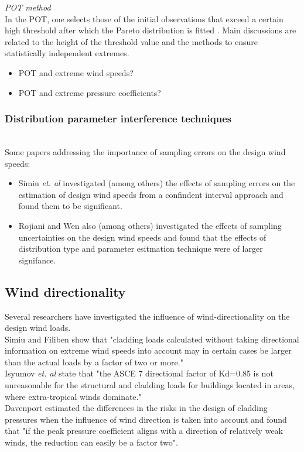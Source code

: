 \documentclass[fleqn]{article}
\begin{document}
\textit{POT method}\\
In the POT, one selects those of the initial observations that exceed a certain high threshold after which the
Pareto distribution is fitted \cite{Pickands_1975}. Main discussions are related to the height of the threshold value and the methods to ensure statistically independent extremes. 
\begin{itemize}
\item POT and extreme wind speeds?
\item POT and extreme pressure coefficients?
\end{itemize}

\subsubsection{Distribution parameter interference techniques}
\\
Some papers addressing the importance of sampling errors on the design wind speeds:
\begin{itemize}
\item Simiu \textit{et. al} \cite{Simiu_1978} investigated (among others) the effects of sampling errors on the estimation of design wind speeds from a confindent interval approach and found them to be significant.
\item 
Rojiani and Wen \cite{Rojiani_1980} also (among others) investigated the effects of sampling uncertainties on the design wind speeds and found that the effects of distribution type and parameter esitmation technique were of larger signifance. 
\end{itemize}

\subsection{Wind directionality}
Several researchers have investigated the influence of wind-directionality on the design wind loads. \\
Simiu and Filiben \cite{Simiu_1981} show that "cladding loads calculated without taking directional information on extreme wind speeds into account may in certain cases be larger than the actual loads by a factor of two or more." \\
Isyumov \textit{et. al} \cite{Isyumov_2014} state that "the ASCE 7 directional factor of Kd=0.85 is not unreasonable for the structural and cladding loads for buildings located in areas, where extra-tropical winds dominate." \\
Davenport \cite{Davenport_1983b} estimated the differences in the risks in the design of cladding pressures when the influence of wind direction is taken into account and found that "if the peak pressure coefficient aligns with a direction of relatively weak winds, the reduction can easily be a factor two". 
\end{document}
